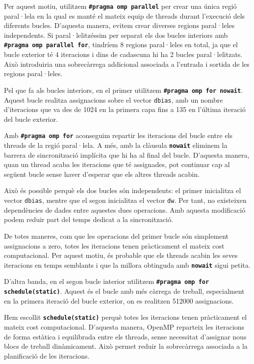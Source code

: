 \documentclass{article}
\begin{document}
Per aquest motiu, utilitzem \textbf{\texttt{\#pragma omp parallel}} per crear una única regió paral·lela en la qual es manté el mateix equip de threads durant l'execució dels diferents bucles.
D'aquesta manera, evitem crear diverses regions paral·leles independents. Si paral·lelitzéssim per separat els dos bucles interiors amb \textbf{\texttt{\#pragma omp parallel for}},
tindríem 8 regions paral·leles en total, ja que el bucle exterior té 4 iteracions i dins de cadascuna hi ha 2 bucles paral·lelitzats.
Això introduiria una sobrecàrrega addicional associada a l'entrada i sortida de les regions paral·leles.

Pel que fa als bucles interiors, en el primer utilitzem \textbf{\texttt{\#pragma omp for nowait}}.
Aquest bucle realitza assignacions sobre el vector \texttt{dbias}, amb un nombre d'iteracions que va des de 1024 en la primera capa fins a 135 en l'última iteració del bucle exterior.

Amb \textbf{\texttt{\#pragma omp for}} aconseguim repartir les iteracions del bucle entre els threads de la regió paral·lela. A més, amb la clàusula \textbf{\texttt{nowait}} eliminem la barrera de sincronització implícita que hi ha al final del bucle. D'aquesta manera, quan un thread acaba les iteracions que té assignades, pot continuar cap al següent bucle sense haver d'esperar que els altres threads acabin.

Això és possible perquè els dos bucles són independents: el primer inicialitza el vector \texttt{dbias}, mentre que el segon inicialitza el vector \texttt{dw}. Per tant, no existeixen dependències de dades entre aquestes dues operacions.
Amb aquesta modificació podem reduir part del temps dedicat a la sincronització.

De totes maneres, com que les operacions del primer bucle són simplement assignacions a zero, totes les iteracions tenen pràcticament el mateix cost computacional. Per aquest motiu, és probable que els threads acabin les seves iteracions en temps semblants i que la millora obtinguda amb \textbf{\texttt{nowait}} sigui petita.

D'altra banda, en el segon bucle interior utilitzem \textbf{\texttt{\#pragma omp for schedule(static)}}. Aquest és el bucle amb més càrrega de treball, especialment en la primera iteració del bucle exterior, on es realitzen 512000 assignacions.

Hem escollit \textbf{\texttt{schedule(static)}} perquè totes les iteracions tenen pràcticament el mateix cost computacional. D'aquesta manera, OpenMP reparteix les iteracions de forma estàtica i equilibrada entre els threads, sense necessitat d'assignar nous blocs de treball dinàmicament.
Això permet reduir la sobrecàrrega associada a la planificació de les iteracions.
\end{document}
